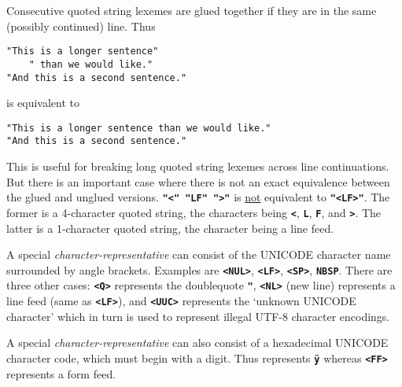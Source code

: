 \documentclass[12pt]{article}
\newcommand{\TT}[1]{{\tt \bfseries #1}}
\newenvironment{indpar}[1][0.3in]%
	{\begin{list}{}%
		     {\setlength{\itemsep}{0in}%
		      \setlength{\topsep}{0in}%
		      \setlength{\parsep}{1ex}%
		      \setlength{\labelwidth}{#1}%
		      \setlength{\leftmargin}{#1}%
		      \addtolength{\leftmargin}{\labelsep}}%
	 \item}%
	{\end{list}}
\begin{document}
Consecutive quoted string lexemes are glued together if they are in the
same (possibly continued) line.  Thus
\begin{indpar}\begin{verbatim}
"This is a longer sentence"
    " than we would like."
"And this is a second sentence."
\end{verbatim}\end{indpar}
is equivalent to
\begin{indpar}\begin{verbatim}
"This is a longer sentence than we would like."
"And this is a second sentence."
\end{verbatim}\end{indpar}
This is useful for
breaking long quoted string lexemes across line continuations.
But there is an important case where there is not an exact equivalence
between the glued and unglued versions.  \TT{"<" "LF" ">"} is
\underline{not} equivalent to \TT{"<LF>"}.  The former is a 4-character
quoted string, the characters being \TT{<}, \TT{L}, \TT{F},
and \TT{>}.  The latter is a 1-character quoted string, the character
being a line feed.

A special {\em character-representative} can consist of
the UNICODE character name surrounded by angle brackets.  Examples are
\TT{<NUL>}, \TT{<LF>}, \TT{<SP>}, \TT{NBSP}.  There are three other cases:
\TT{<Q>} represents the doublequote \TT{"}, \TT{<NL>} (new line)
represents a line feed (same as \TT{<LF>}), and \TT{<UUC>} represents
the `unknown UNICODE character' which in turn is used to represent
illegal UTF-8 character encodings.

A special {\em character-representative} can also consist of
a hexadecimal UNICODE character code, which must begin with a digit.
Thus \TT{<0FF>} represents \TT{\"y} whereas \TT{<FF>} represents
a form feed.
\end{document}
